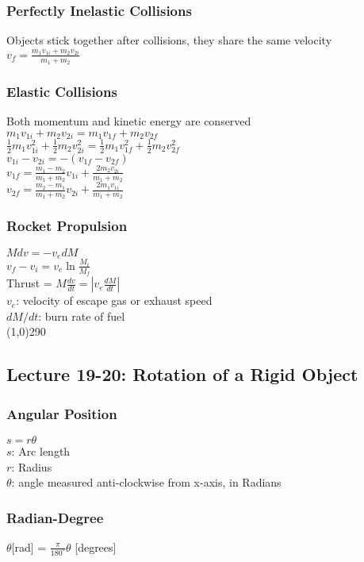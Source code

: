 \documentclass[10 pt]{article}
\begin{document}
\begin{multicols}{2}
\subsubsection*{Perfectly Inelastic Collisions}
\noindent Objects stick together after collisions, they share the same velocity \\
\indent $\displaystyle v_f = \frac{m_1 v_{1i} + m_2 v_{2i}}{m_1 + m_2}$
\subsubsection*{Elastic Collisions}
\noindent Both momentum and kinetic energy are conserved \\
\indent $m_1 v_{1i} + m_2 v_{2i} = m_1 v_{1f} + m_2 v_{2f}$ \\ 
\indent $\displaystyle \frac{1}{2} m_1 v_{1i}^2 + \frac{1}{2} m_2 v_{2i}^2 = \frac{1}{2}m_1 v_{1f}^2 + \frac{1}{2}m_2 v_{2f}^2$ \\
\indent $v_{1i} - v_{2i} = -(v_{1f} - v_{2f})$ \\
\indent $\displaystyle v_{1f} = \frac{m_1 - m_2}{m_1 + m_2}v_{1i} + \frac{2m_2 v_{2i}}{m_1 + m_2}$ \\
\indent $\displaystyle v_{2f} = \frac{m_2 - m_1}{m_1 + m_2}v_{2i} + \frac{2m_1 v_{1i}}{m_1 + m_2}$
\subsubsection*{Rocket Propulsion}
$M dv = -v_e dM$ \\
\indent $\displaystyle v_f - v_i = v_e \ln{\frac{M_i}{M_f}}$ \\
\indent Thrust = $M \frac{dv}{dt} = |v_e \frac{dM}{dt}|$ \\
$v_e$: velocity of escape gas or exhaust speed \\
$dM/dt$: burn rate of fuel \\
\line(1,0){290}
\subsection*{Lecture 19-20: Rotation of a Rigid Object}
\subsubsection*{Angular Position}
$s = r\theta$ \\
$s$: Arc length \\
$r$: Radius \\
$\theta$: angle measured anti-clockwise from x-axis, in Radians
\subsubsection*{Radian-Degree}
$\theta$[rad] = $\frac{\pi}{180^\circ}\theta$ [degrees]

\end{multicols}
\end{document}
